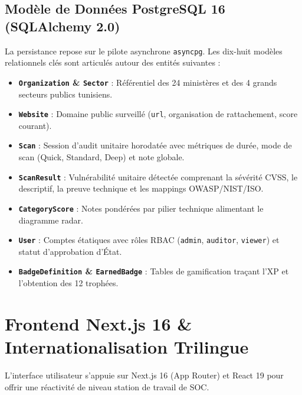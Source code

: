 \subsection{Modèle de Données PostgreSQL 16 (SQLAlchemy 2.0)}
La persistance repose sur le pilote asynchrone \texttt{asyncpg}. Les dix-huit modèles relationnels clés sont articulés autour des entités suivantes :
\begin{itemize}
    \item \textbf{\texttt{Organization} \& \texttt{Sector}} : Référentiel des 24 ministères et des 4 grands secteurs publics tunisiens.
    \item \textbf{\texttt{Website}} : Domaine public surveillé (\texttt{url}, organisation de rattachement, score courant).
    \item \textbf{\texttt{Scan}} : Session d'audit unitaire horodatée avec métriques de durée, mode de scan (Quick, Standard, Deep) et note globale.
    \item \textbf{\texttt{ScanResult}} : Vulnérabilité unitaire détectée comprenant la sévérité CVSS, le descriptif, la preuve technique et les mappings OWASP/NIST/ISO.
    \item \textbf{\texttt{CategoryScore}} : Notes pondérées par pilier technique alimentant le diagramme radar.
    \item \textbf{\texttt{User}} : Comptes étatiques avec rôles RBAC (\texttt{admin}, \texttt{auditor}, \texttt{viewer}) et statut d'approbation d'État.
    \item \textbf{\texttt{BadgeDefinition} \& \texttt{EarnedBadge}} : Tables de gamification traçant l'XP et l'obtention des 12 trophées.
\end{itemize}

\section{Frontend Next.js 16 \& Internationalisation Trilingue}
L'interface utilisateur s'appuie sur Next.js 16 \cite{nextjs} (App Router) et React 19 pour offrir une réactivité de niveau station de travail de SOC.

